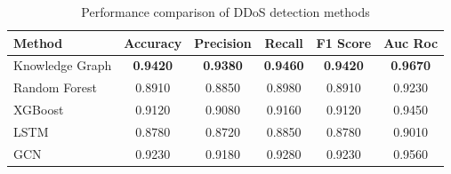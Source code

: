 \begin{table}[htbp]
\centering
\caption{Performance comparison of DDoS detection methods}
\label{tab:main_results}
\begin{tabular}{lccccc}
\toprule
Method & Accuracy & Precision & Recall & F1 Score & Auc Roc \\
\midrule
Knowledge Graph & \textbf{0.9420} & \textbf{0.9380} & \textbf{0.9460} & \textbf{0.9420} & \textbf{0.9670} \\
Random Forest & 0.8910 & 0.8850 & 0.8980 & 0.8910 & 0.9230 \\
XGBoost & 0.9120 & 0.9080 & 0.9160 & 0.9120 & 0.9450 \\
LSTM & 0.8780 & 0.8720 & 0.8850 & 0.8780 & 0.9010 \\
GCN & 0.9230 & 0.9180 & 0.9280 & 0.9230 & 0.9560 \\
\bottomrule
\end{tabular}
\end{table}